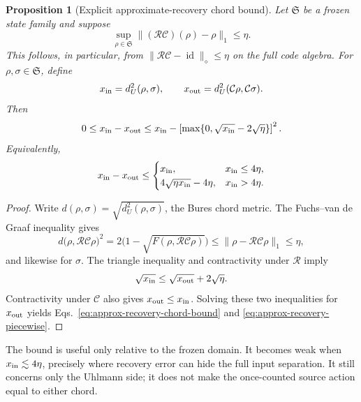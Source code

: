 \documentclass[11pt]{article}
\newtheorem{proposition}{Proposition}
\newcommand{\id}{\operatorname{id}}
\begin{document}
\begin{proposition}[Explicit approximate-recovery chord bound]
Let \(\mathfrak S\) be a frozen state family and suppose
\begin{equation}
 \sup_{\rho\in\mathfrak S}
 \lVert(\mathcal R\mathcal C)(\rho)-\rho\rVert_1\leq\eta.
 \label{eq:state-family-recovery-error}
\end{equation}
This follows, in particular, from
\(\lVert\mathcal R\mathcal C-\id\rVert_\diamond\leq\eta\) on the full code
algebra.  For \(\rho,\sigma\in\mathfrak S\), define
\begin{equation}
 x_{\rm in}=d_U^2(\rho,\sigma),\qquad
 x_{\rm out}=d_U^2(\mathcal C\rho,\mathcal C\sigma).
\end{equation}
Then
\begin{equation}
 0\leq x_{\rm in}-x_{\rm out}
 \leq x_{\rm in}-
 \left[\max\{0,\sqrt{x_{\rm in}}-2\sqrt\eta\}\right]^2.
 \label{eq:approx-recovery-chord-bound}
\end{equation}
Equivalently,
\begin{equation}
 x_{\rm in}-x_{\rm out}
 \leq
 \begin{cases}
 x_{\rm in},&x_{\rm in}\leq4\eta,\\
 4\sqrt{\eta x_{\rm in}}-4\eta,&x_{\rm in}>4\eta.
 \end{cases}
 \label{eq:approx-recovery-piecewise}
\end{equation}
\end{proposition}
\begin{proof}
Write \(d(\rho,\sigma)=\sqrt{d_U^2(\rho,\sigma)}\), the Bures chord metric.
The Fuchs--van de Graaf inequality \cite{FuchsVandeGraaf1999} gives
\begin{equation}
 d\bigl(\rho,\mathcal R\mathcal C\rho\bigr)^2
 =2\bigl(1-\sqrt{F(\rho,\mathcal R\mathcal C\rho)}\bigr)
 \leq\lVert\rho-\mathcal R\mathcal C\rho\rVert_1\leq\eta,
\end{equation}
and likewise for \(\sigma\).  The triangle inequality and contractivity under
\(\mathcal R\) imply
\begin{equation}
 \sqrt{x_{\rm in}}
 \leq\sqrt{x_{\rm out}}+2\sqrt\eta.
\end{equation}
Contractivity under \(\mathcal C\) also gives
\(x_{\rm out}\leq x_{\rm in}\).  Solving these two inequalities for
\(x_{\rm out}\) yields Eqs.~\eqref{eq:approx-recovery-chord-bound} and
\eqref{eq:approx-recovery-piecewise}.
\end{proof}

The bound is useful only relative to the frozen domain.  It becomes weak when
\(x_{\rm in}\lesssim4\eta\), precisely where recovery error can hide the full
input separation.  It still concerns only the Uhlmann side; it does not make
the once-counted source action equal to either chord.
\end{document}
